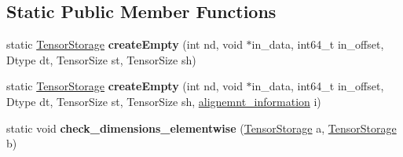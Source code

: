 \subsection*{Static Public Member Functions}
\begin{DoxyCompactItemize}
\item 
\mbox{\label{classTensorStorage_adc86cd3668de177f7f53895405d602f5}} 
static \hyperlink{classTensorStorage}{Tensor\+Storage} {\bfseries create\+Empty} (int nd, void $\ast$in\+\_\+data, int64\+\_\+t in\+\_\+offset, Dtype dt, Tensor\+Size st, Tensor\+Size sh)
\item 
\mbox{\label{classTensorStorage_a7efa8bff4fad4642f035a28de2e0b494}} 
static \hyperlink{classTensorStorage}{Tensor\+Storage} {\bfseries create\+Empty} (int nd, void $\ast$in\+\_\+data, int64\+\_\+t in\+\_\+offset, Dtype dt, Tensor\+Size st, Tensor\+Size sh, \hyperlink{structalignemnt__information}{alignemnt\+\_\+information} i)
\item 
\mbox{\label{classTensorStorage_a91968d3da292d7069839e13ab9307110}} 
static void {\bfseries check\+\_\+dimensions\+\_\+elementwise} (\hyperlink{classTensorStorage}{Tensor\+Storage} a, \hyperlink{classTensorStorage}{Tensor\+Storage} b)
\end{DoxyCompactItemize}
